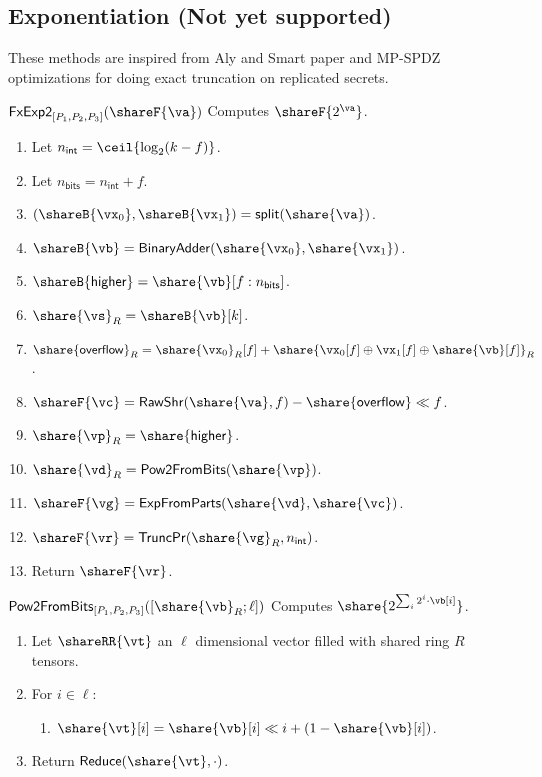\subsection{Exponentiation (Not yet supported)}
\label{subsec:exp}

These methods are inspired from Aly and Smart paper and MP-SPDZ optimizations
for doing exact truncation on replicated secrets.

\msubsubsection
  {$\mathsf{FxExp2}_{[P_1, P_2, P_3]}(\shareF{\va})$}
  Computes $\shareF{2^\va}$.
\begin{enumerate}
	\item Let $n_{\mathsf{int}} = \ceil{\log_2({k - f})}$.
	\item Let $n_{\mathsf{bits}} = n_{\mathsf{int}} + f$.
	\item $(\shareB{\vx_0}, \shareB{\vx_1}) = \mathsf{split}(\share{\va})$.
	\item $\shareB{\vb} = \mathsf{BinaryAdder}(\share{\vx_0}, \share{\vx_1})$.
	\item $\shareB{\mathsf{higher}} = \share{\vb}[f:n_\mathsf{bits}]$.
	\item $\share{\vs}_R = \shareB{\vb}[k]$.
	\item $\share{\mathsf{overflow}}_R = \share{\vx_0}_R[f] + \share{
	\vx_0[f] \oplus \vx_1[f] \oplus \share{\vb}[f]}_R$.
	\item $\shareF{\vc} = \mathsf{RawShr}(\share{\va}, f) - \share{\mathsf{overflow}} \ll f$.
	\item $\share{\vp}_R = \share{\mathsf{higher}}$.
	\item $\share{\vd}_R = \mathsf{Pow2FromBits}(\share{\vp})$.
	\item $\shareF{\vg} = \mathsf{ExpFromParts}(\share{\vd},\share{\vc})$.
	\item $\shareF{\vr} = \mathsf{TruncPr}(\share{\vg}_R, n_\mathsf{int})$.
	\item Return $\shareF{\vr}$.

\end{enumerate}


\msubsubsection
  {$\mathsf{Pow2FromBits}_{[P_1, P_2, P_3]}([\share{\vb}_R; \ell])$}
  Computes $\share{2^{\sum_i{2^i\cdot \vb[i]}}}$.
\begin{enumerate}
	\item Let $\shareRR{\vt}$ an $\ell$ dimensional vector filled with
	shared ring $R$ tensors.
	\item For $i \in \ell$:
	\begin{enumerate}
		\item $\share{\vt}[i] = \share{\vb}[i] \ll i + (1 - \share{\vb}[i])$.
	\end{enumerate}
	\item Return $\mathsf{Reduce}(\share{\vt}, \cdot)$.
\end{enumerate}

